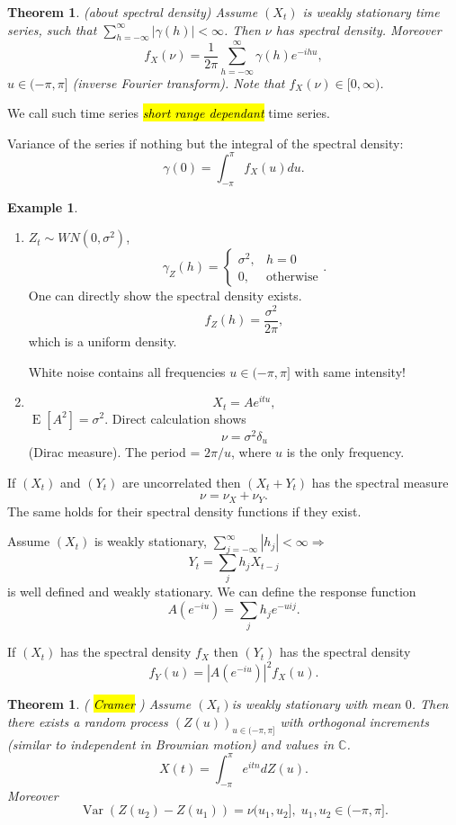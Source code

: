\documentclass[12pt,a4paper, notitlepage]{book}
\newcommand{\hlc}[2][yellow]{ {\sethlcolor{#1} \hl{#2}} }
\theoremstyle{definition} %
\newtheorem{example}[definition]{Example}
\theoremstyle{plain} %
\newtheorem{theorem}[definition]{Theorem}
\newcommand{\C}{\mathbb C}
\DeclareMathOperator{\Var}{Var}
\DeclareMathOperator{\E}{E}
\newcommand{\Important}[1]{ {\it \hlc{#1} } }
\begin{document}
\begin{theorem} (about spectral density)
Assume $(X_t)$ is weakly stationary time series, such that $\sum_{h =-\infty }^\infty|\gamma(h)| < \infty$. Then $\nu$ has spectral density. Moreover 
\[ f_X(\nu) = \frac{1}{2 \pi} \sum_{h = -\infty}^\infty\gamma(h) e^{-i h u}, \]
$ u\in (-\pi, \pi]$ (inverse Fourier transform). Note that $f_X(\nu) \in [0, \infty)$. 
\end{theorem}
We call such time series \Important{short range dependant} time series. 

Variance of the series if nothing but the integral of the spectral density: 
\[ \gamma(0) = \int_{-\pi}^\pi f_X(u)du. \]

\begin{example}
\begin{enumerate}
\item $Z_t \sim WN(0, \sigma^2)$, 
\[ \gamma_Z(h) = \begin{cases} \sigma^2, & h = 0 \\ 0, & \text{otherwise} \end{cases} . \]
 One can directly show the spectral density exists. 
\[ f_Z(h) = \frac{\sigma^2}{2 \pi}, \]
 which is a uniform density. 

White noise contains all frequencies $u \in (-\pi, \pi]$ with same intensity! 
\item  
\[ X_t = A e^{i t u}, \] 
$ \E[ A^2 ] = \sigma^2$. Direct calculation shows 
\[ \nu = \sigma^2 \delta_u \] (Dirac measure). The period = $2 \pi / u$, where $u$ is the only frequency. 
\end{enumerate}
\vskip0.5cm

If $(X_t)$ and $(Y_t)$ are uncorrelated then  $(X_t + Y_t)$ has the spectral measure 
\[ \nu = \nu_X + \nu_Y. \]
 The same holds for their spectral density functions if they exist. 

Assume $(X_t)$ is weakly stationary, $\sum_{j=-\infty}^\infty |h_j| < \infty \Rightarrow $ 
\[ Y_t = \sum_j h_j X_{t-j} \]
 is well defined and weakly stationary. We can define the response function 
\[ A(e^{-iu}) = \sum_j h_j e^{-u i j}. \]

If $(X_t)$ has the spectral density $f_X$ then $(Y_t)$ has the spectral density 
\[ f_Y(u) = |A(e^{-iu})|^2 f_X(u) . \] 

\begin{theorem} (\Important{Cramer})
Assume $(X_t)$is weakly stationary with mean $0$. Then there exists a random process $(Z(u))_{u \in(-\pi, \pi]}$ with 
orthogonal increments (similar to independent in Brownian motion) and values in $\C$. 
\[ X(t) = \int_{-\pi}^\pi e^{i t n}dZ(u) . \]
Moreover 
\[ \Var(Z(u_2) - Z(u_1)) = \nu(u_1, u_2], \; u_1, u_2 \in (-\pi,\pi]. \]


\end{theorem}
\end{example}
\end{document}
